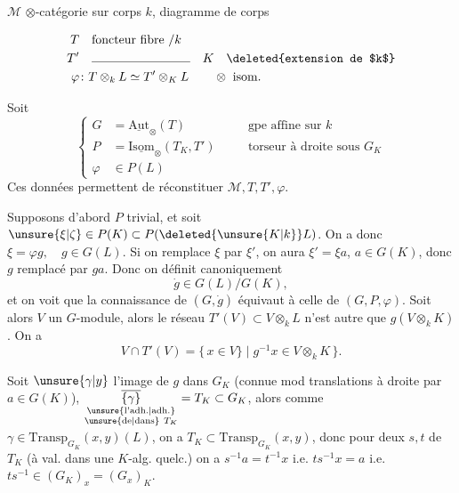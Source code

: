 $\mathcal M$ $\otimes$-catégorie sur corps $k$,
diagramme de corps

\[
\begin{aligned}
T&\quad\text{foncteur fibre }/k\\
T'&\quad\rule{2.8cm}{.35pt}\quad K\quad\text{\deleted{extension de $k$}}\\
\varphi&\colon T\otimes_k L\simeq T'\otimes_K L\qquad\otimes\ \text{isom.}
\end{aligned}
\]

Soit
\[
\left\{\begin{aligned}
G&=\underline{\mathrm{Aut}}_{\otimes}(T)&\quad&\text{gpe affine sur }k\\
P&=\underline{\mathrm{Isom}}_{\otimes}(T_K,T')&&\text{torseur à droite sous }G_K\\
\varphi&\in P(L)
\end{aligned}\right.
\]
Ces données permettent de réconstituer $\mathcal M,T,T',\varphi$.

Supposons d'abord $P$ trivial, et soit $\unsure{\xi|\zeta}\in P(K)\subset P(\deleted{\unsure{K|k}}L)$. On a donc $\xi=\varphi g,\quad g\in G(L)$. Si on remplace $\xi$ par $\xi'$, on aura $\xi'=\xi a$, $a\in G(K)$, donc $g$ remplacé par $ga$. Donc on définit canoniquement
\[
\dot g\in G(L)/G(K),
\]
et on voit que la connaissance de $(G,\dot g)$ équivaut à celle de $(G,P,\varphi)$. Soit alors $V$ un $G$-module, alors le réseau $T'(V)\subset V\otimes_k L$ n'est autre que $g(V\otimes_k K)$. On a
\[
V\cap T'(V)=\{\,x\in V\}\mid g^{-1}x\in V\otimes_k K\,\}.
\]

  Soit $\unsure{\gamma|y}$ l'image de $g$ dans $G_K$ (connue mod translations à droite par $a\in G(K)$), $\underset{\substack{\text{\unsure{l'adh.|adh.}}\\\text{\unsure{de|dans}}\ T_K}}{\overline{\{\gamma\}}}=T_K\subset G_K$,  alors  comme  $\gamma\in\mathrm{Transp}_{G_K}(x,y)(L)$, on a $T_K\subset\mathrm{Transp}_{G_K}(x,y)$,  donc pour deux   $s,t$  de $T_K$ (à val. dans une $K$-alg. quelc.) on a $s^{-1}a=t^{-1}x$ i.e. $ts^{-1}x=a$ i.e. $ts^{-1}\in(G_K)_x=(G_x)_K$.

